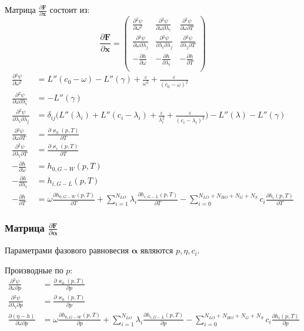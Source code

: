 \documentclass[12pt]{article}
\newcommand{\pd}[2]{\frac{\partial #1}{\partial #2}}
\begin{document}
Матрица $\pd{\mathbf{F}}{\mathbf{x}}$ состоит из:
\[
\pd{\mathbf{F}}{\mathbf{x}} = 
\begin{pmatrix}
\pd{{}^2\psi}{\omega^2} & \pd{{}^2\psi}{\omega \partial \lambda_i} & \pd{{}^2
\psi}{\omega \partial T}\\
\pd{{}^2\psi}{\omega \partial \lambda_j} & \pd{{}^2\psi}{\lambda_i \partial
\lambda_j} & \pd{{}^2
\psi}{\lambda_j \partial T}\\
-\pd{h}{\omega} & -\pd{h}{\lambda_i} & -\pd{h}{T}\\
\end{pmatrix}
\]
\begin{align*}
\pd{{}^2\psi}{\omega^2} &= L''(c_0 - \omega) - L''(\gamma) +
\frac{\varepsilon}{\omega^2} + \frac{\varepsilon}{(c_0 - \omega)^2}\\
\pd{{}^2\psi}{\omega \partial \lambda_i} &= - L''(\gamma)\\
\pd{{}^2\psi}{\lambda_i \partial \lambda_j} &=
\delta_{ij} \Big(L''(\lambda_i) + L''(c_i - \lambda_i) +
\frac{\varepsilon}{\lambda_i^2} + \frac{\varepsilon}{(c_i - \lambda_i)^2}\Big) - L''(\lambda) 
- L''(\gamma)\\
\pd{{}^2\psi}{\omega \partial T} &= \pd{\varkappa_0(p, T)}{T} \\
\pd{{}^2\psi}{\lambda_i \partial T} &= \pd{\varkappa_i(p, T)}{T}\\
-\pd{h}{\omega} &= h_{0, G-W}(p, T)\\
-\pd{h}{\lambda_i} &= h_{i, G-L}(p, T)\\
-\pd{h}{T} &=
\omega \pd{h_{0,G-W}(p,T)}{T}
+\sum_{i=1}^{N_{LO}} \lambda_i \pd{h_{i,G-L}(p,T)}{T}
-\sum_{i=0}^{N_{LO}+N_{HO}+N_{G}+N_{S}} c_i \pd{h_i(p,T)}{T}
\end{align*}

\subsubsection{Матрица $\pd{\mathbf{F}}{\mathbf{\boldsymbol\alpha}}$}

Параметрами фазового равновесия $\boldsymbol\alpha$ являются $p, \eta, c_i$.

Производные по $p$:
\begin{align*}
\pd{{}^2\psi}{\omega \partial p} &= \pd{\varkappa_0(p,T)}{p}\\
\pd{{}^2\psi}{\lambda_i \partial p} &= \pd{\varkappa_0(p,T)}{p}\\
\pd{(\eta - h)}{\omega \partial p} &= 
\omega \pd{h_{0,G-W}(p,T)}{p}
+\sum_{i=1}^{N_{LO}} \lambda_i \pd{h_{i,G-L}(p,T)}{p}
-\sum_{i=0}^{N_{LO}+N_{HO}+N_{G}+N_{S}} c_i \pd{h_i(p,T)}{p}
\end{align*}
\end{document}

